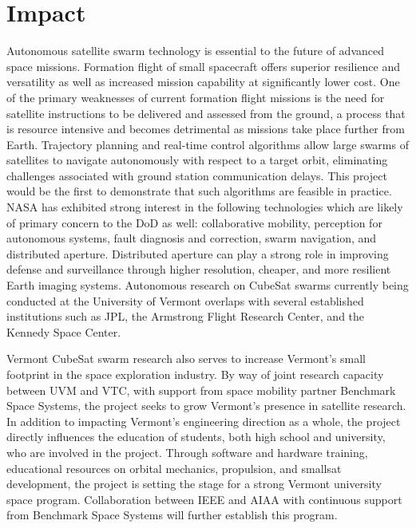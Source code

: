 \section{Impact}

Autonomous satellite swarm technology is essential to the future of
advanced space missions. Formation flight of small spacecraft offers
superior resilience and versatility as well as increased mission
capability at significantly lower cost. One of the primary weaknesses
of current formation flight missions is the need for satellite
instructions to be delivered and assessed from the ground, a process
that is resource intensive and becomes detrimental as missions take
place further from Earth. Trajectory planning and real-time control
algorithms allow large swarms of satellites to navigate autonomously
with respect to a target orbit, eliminating challenges associated with
ground station communication delays. This project would be the first
to demonstrate that such algorithms are feasible in practice. NASA has
exhibited strong interest in the following technologies which are
likely of primary concern to the DoD as well: collaborative mobility,
perception for autonomous systems, fault diagnosis and correction,
swarm navigation, and distributed aperture. Distributed aperture can
play a strong role in improving defense and surveillance through
higher resolution, cheaper, and more resilient Earth imaging
systems. Autonomous research on CubeSat swarms currently being
conducted at the University of Vermont overlaps with several
established institutions such as JPL, the Armstrong Flight Research
Center, and the Kennedy Space Center. 

Vermont CubeSat swarm research also serves to increase Vermont’s small
footprint in the space exploration industry. By way of joint research
capacity between UVM and VTC, with support from space mobility partner
Benchmark Space Systems, the project seeks to grow Vermont’s presence
in satellite research. In addition to impacting Vermont’s engineering
direction as a whole, the project directly influences the education of
students, both high school and university, who are involved in the
project. Through software and hardware training, educational resources
on orbital mechanics, propulsion, and smallsat development, the
project is setting the stage for a strong Vermont university space
program. Collaboration between IEEE and AIAA with continuous support
from Benchmark Space Systems will further establish this program.

